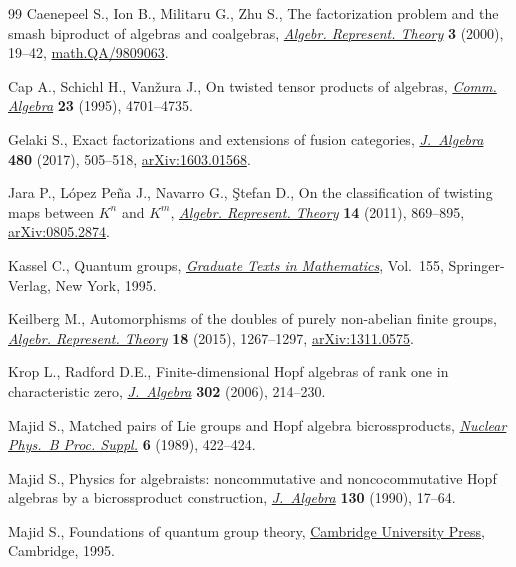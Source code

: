 \documentclass[10pt,a4paper]{amsart}
\numberwithin{equation}{section}
\begin{document}
\begin{thebibliography}{99}
Caenepeel S., Ion B., Militaru G., Zhu S., The factorization problem and the
 smash biproduct of algebras and coalgebras, \href{https://doi.org/10.1023/A:1009917210863}{\textit{Algebr. Represent.
 Theory}} \textbf{3} (2000), 19--42, \href{https://arxiv.org/abs/math.QA/9809063}{math.QA/9809063}.

Cap A., Schichl H., Van\v{z}ura J., On twisted tensor products of algebras,
 \href{https://doi.org/10.1080/00927879508825496}{\textit{Comm. Algebra}} \textbf{23} (1995), 4701--4735.

Gelaki S., Exact factorizations and extensions of fusion categories,
 \href{https://doi.org/10.1016/j.jalgebra.2017.02.034}{\textit{J.~Algebra}} \textbf{480} (2017), 505--518, \href{https://arxiv.org/abs/1603.01568}{arXiv:1603.01568}.

Jara P., L\'opez Pe\~na J., Navarro G., \c{S}tefan D., On the classification of
 twisting maps between {$K^n$} and {$K^m$}, \href{https://doi.org/10.1007/s10468-010-9222-x}{\textit{Algebr. Represent. Theory}}
 \textbf{14} (2011), 869--895, \href{https://arxiv.org/abs/0805.2874}{arXiv:0805.2874}.

Kassel C., Quantum groups, \href{https://doi.org/10.1007/978-1-4612-0783-2}{\textit{Graduate Texts in Mathematics}}, Vol.~155,
 Springer-Verlag, New York, 1995.

Keilberg M., Automorphisms of the doubles of purely non-abelian finite groups,
 \href{https://doi.org/10.1007/s10468-015-9540-0}{\textit{Algebr. Represent. Theory}} \textbf{18} (2015), 1267--1297,
 \href{https://arxiv.org/abs/1311.0575}{arXiv:1311.0575}.

Krop L., Radford D.E., Finite-dimensional {H}opf algebras of rank one in
 characteristic zero, \href{https://doi.org/10.1016/j.jalgebra.2006.03.031}{\textit{J.~Algebra}} \textbf{302} (2006), 214--230.

Majid S., Matched pairs of {L}ie groups and {H}opf algebra bicrossproducts,
 \href{https://doi.org/10.1016/0920-5632(89)90488-X}{\textit{Nuclear Phys.~B Proc. Suppl.}} \textbf{6} (1989), 422--424.

Majid S., Physics for algebraists: noncommutative and noncocommutative {H}opf
 algebras by a bicrossproduct construction, \href{https://doi.org/10.1016/0021-8693(90)90099-A}{\textit{J.~Algebra}} \textbf{130}
 (1990), 17--64.

Majid S., Foundations of quantum group theory, \href{https://doi.org/10.1017/CBO9780511613104}{Cambridge University Press},
 Cambridge, 1995.


\end{thebibliography}
\end{document}
